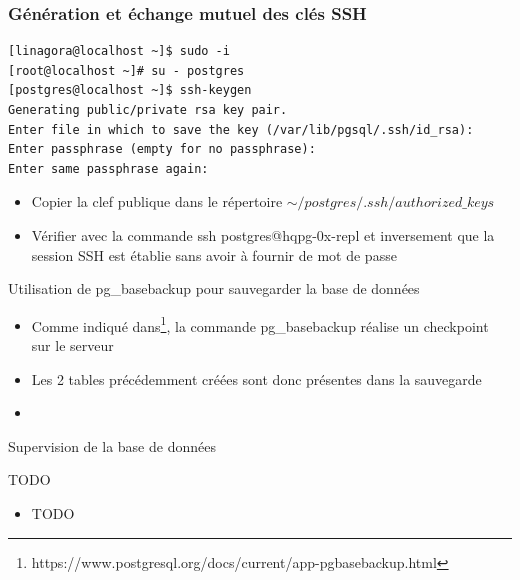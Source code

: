 
\begin{frame}[fragile]\frametitle{Génération et échange mutuel des clés SSH}
\label{sec:ssh-keys}

\begin{verbatim}
[linagora@localhost ~]$ sudo -i
[root@localhost ~]# su - postgres
[postgres@localhost ~]$ ssh-keygen 
Generating public/private rsa key pair.
Enter file in which to save the key (/var/lib/pgsql/.ssh/id_rsa): 
Enter passphrase (empty for no passphrase): 
Enter same passphrase again: 
\end{verbatim}

\begin{itemize}
   \item Copier la clef publique dans le répertoire $\sim/postgres/.ssh/authorized\_keys$
   \item Vérifier avec la commande ssh \textsf{postgres@hqpg-0x-repl} et inversement que la session SSH est établie sans avoir à fournir de mot de passe
\end{itemize}

\end{frame}


\begin{frame}{Utilisation de \textsf{pg\_basebackup} pour sauvegarder la base de données}

\begin{itemize}
   \item Comme indiqué dans\footnote{https://www.postgresql.org/docs/current/app-pgbasebackup.html}, la commande \textsf{pg\_basebackup} réalise un checkpoint sur le serveur
   \item Les 2 tables précédemment créées sont donc présentes dans la sauvegarde
   \item {}
\end{itemize}

\end{frame}


\begin{frame}[fragile]{Supervision de la base de données}

   TODO

\begin{itemize}

   \item TODO

\end{itemize}

\begin{toile}
\end{toile}

\end{frame}

